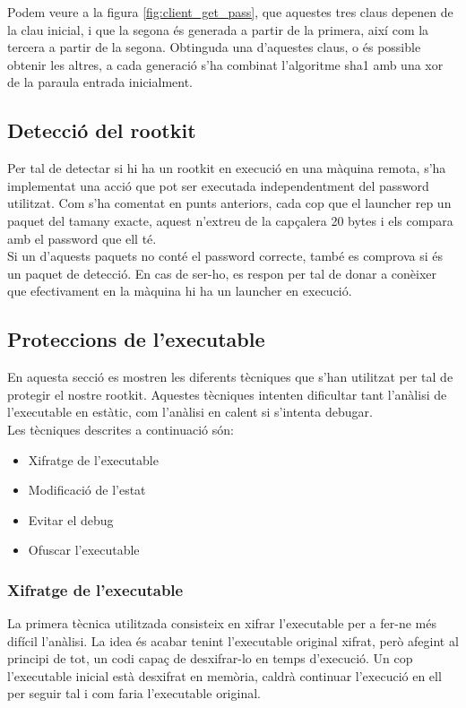Podem veure a la figura \ref{fig:client_get_pass}, que aquestes tres claus depenen de la clau inicial, i que la segona és generada a partir de la 
primera, així com la tercera a partir de la segona. Obtinguda una d'aquestes claus, o és possible obtenir les altres,
a cada generació s'ha combinat l'algoritme sha1 amb una xor de la paraula entrada inicialment.

\subsection{Detecció del rootkit}
Per tal de detectar si hi ha un rootkit en execució en una màquina remota, s'ha implementat una acció
que pot ser executada independentment del password utilitzat. Com s'ha comentat en punts
anteriors, cada cop que el launcher rep un paquet del tamany exacte, aquest n'extreu de la capçalera 20 
bytes i els compara amb el password que ell té. \\

Si un d'aquests paquets no conté el password correcte, també
es comprova si és un paquet de detecció. En cas de ser-ho, es respon per tal de donar a conèixer que 
efectivament en la màquina hi ha un launcher en execució. \\

\subsection{Proteccions de l'executable}
En aquesta secció es mostren les diferents tècniques que s'han utilitzat per tal de protegir el nostre
rootkit. Aquestes tècniques intenten dificultar tant l'anàlisi de l'executable en estàtic, com
l'anàlisi en calent si s'intenta debugar. \\

Les tècniques descrites a continuació són:
\begin{itemize}
	\item Xifratge de l'executable
	\item Modificació de l'estat
	\item Evitar el debug
	\item Ofuscar l'executable
\end{itemize}
\subsubsection{Xifratge de l'executable}
La primera tècnica utilitzada consisteix en xifrar l'executable per a fer-ne més difícil l'anàlisi. La idea 
és acabar tenint l'executable original xifrat, però afegint al principi de tot, un codi capaç de desxifrar-lo en temps 
d'execució. Un cop l'executable inicial està desxifrat en memòria,
caldrà continuar l'execució en ell per seguir tal i com faria l'executable original. \\

